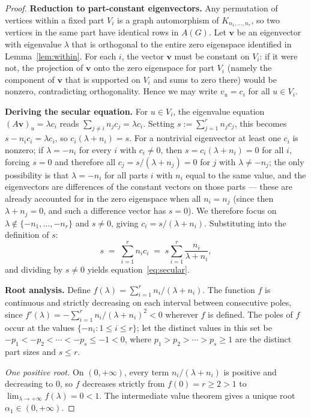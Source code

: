 \documentclass[preprint,12pt]{elsarticle}
\theoremstyle{plain}
\theoremstyle{definition}
\begin{document}
\begin{proof}
\textbf{Reduction to part-constant eigenvectors.}
Any permutation of vertices within a fixed part $V_i$ is a graph
automorphism of $K_{n_1,\ldots,n_r}$, so two vertices in the same
part have identical rows in $A(G)$.
Let $\mathbf{v}$ be an eigenvector with eigenvalue $\lambda$ that is
orthogonal to the entire zero eigenspace identified in
Lemma~\ref{lem:within}.
For each $i$, the vector $\mathbf{v}$ must be constant on $V_i$:
if it were not, the projection of $\mathbf{v}$ onto the zero eigenspace
for part $V_i$ (namely the component of $\mathbf{v}$ that is supported
on $V_i$ and sums to zero there) would be nonzero, contradicting
orthogonality.
Hence we may write $v_u = c_i$ for all $u \in V_i$.

\textbf{Deriving the secular equation.}
For $u \in V_i$, the eigenvalue equation $(A\mathbf{v})_u = \lambda c_i$
reads $\sum_{j \neq i} n_j c_j = \lambda c_i$.
Setting $s := \sum_{j=1}^r n_j c_j$, this becomes $s - n_i c_i = \lambda c_i$,
so $c_i(\lambda + n_i) = s$.
For a nontrivial eigenvector at least one $c_i$ is nonzero; if $\lambda = -n_i$
for every $i$ with $c_i \neq 0$, then $s = c_i(\lambda + n_i) = 0$ for
all $i$, forcing $s = 0$ and therefore all $c_j = s/(\lambda+n_j) = 0$
for $j$ with $\lambda \neq -n_j$; the only possibility is that $\lambda = -n_i$
for all parts $i$ with $n_i$ equal to the same value, and the eigenvectors
are differences of the constant vectors on those parts --- these are already
accounted for in the zero eigenspace when all $n_i = n_j$ (since then
$\lambda + n_j = 0$, and such a difference vector has $s = 0$).
We therefore focus on $\lambda \notin \{-n_1,\ldots,-n_r\}$ and $s \neq 0$,
giving $c_i = s/(\lambda + n_i)$.
Substituting into the definition of $s$:
\[
  s
  \;=\; \sum_{i=1}^r n_i c_i
  \;=\; s \sum_{i=1}^r \frac{n_i}{\lambda + n_i},
\]
and dividing by $s \neq 0$ yields equation~\eqref{eq:secular}.

\textbf{Root analysis.}
Define $f(\lambda) = \sum_{i=1}^r n_i/(\lambda + n_i)$.
The function $f$ is continuous and strictly decreasing on each interval
between consecutive poles, since
$f'(\lambda) = -\sum_{i=1}^r n_i/(\lambda + n_i)^2 < 0$ wherever $f$ is
defined.
The poles of $f$ occur at the values $\{-n_i : 1 \leq i \leq r\}$;
let the distinct values in this set be
$-p_1 < -p_2 < \cdots < -p_s \leq -1 < 0$,
where $p_1 > p_2 > \cdots > p_s \geq 1$ are the distinct part sizes
and $s \leq r$.

\textit{One positive root.}
On $(0,+\infty)$, every term $n_i/(\lambda + n_i)$ is positive and
decreasing to $0$, so $f$ decreases strictly from $f(0) = r \geq 2 > 1$
to $\lim_{\lambda \to +\infty} f(\lambda) = 0 < 1$.
The intermediate value theorem gives a unique root $\alpha_1 \in (0,+\infty)$.


\end{proof}
\end{document}
